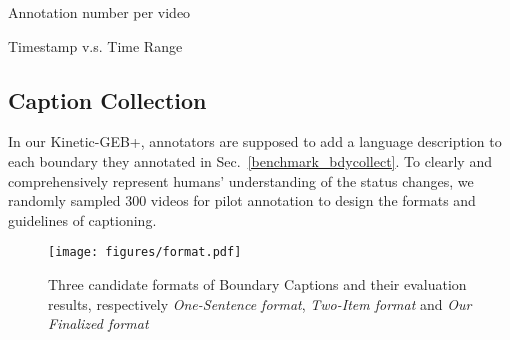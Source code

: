 \documentclass[runningheads]{llncs}
\begin{document}
\noindent
\begin{minipage}{\textwidth}
\begin{center}
\begin{minipage}[t]{0.52\textwidth}
\makeatletter{}
\caption{Annotation number per video}
\setlength{\belowcaptionskip}{0.5cm}
\label{table:annotation_num}
\end{minipage}
\begin{minipage}[t]{0.46\textwidth}
\makeatletter{}
\caption{Timestamp v.s. Time Range}
\setlength{\belowcaptionskip}{0.5cm}
\label{table:timestamp_range}
\end{minipage}
\end{center}
\end{minipage} 
\subsection{Caption Collection}
In our Kinetic-GEB+, annotators are supposed to add a language description to each boundary they annotated in Sec.~\ref{benchmark_bdycollect}. To clearly and comprehensively represent humans’ understanding of the status changes, we randomly sampled 300 videos for pilot annotation to design the formats and guidelines of captioning.

\begin{figure}[t]
\centering
\texttt{[image: figures/format.pdf]}
\setlength{\abovecaptionskip}{0.5cm}
\caption{Three candidate formats of Boundary Captions and their evaluation results, respectively \textit{One-Sentence format}, \textit{Two-Item format} and \textit{Our Finalized format}}
\label{fig:format}
\end{figure}
\end{document}
